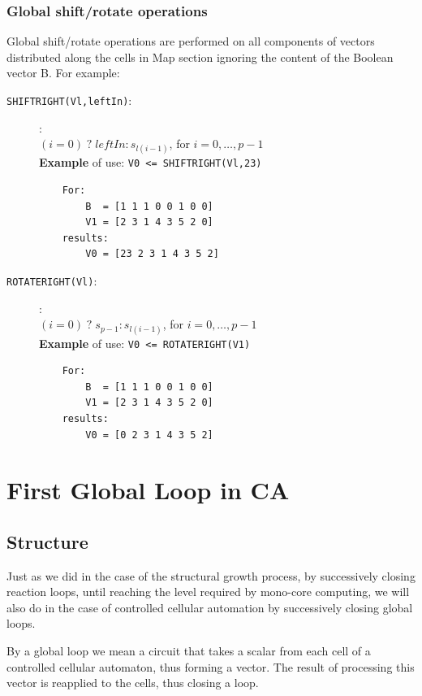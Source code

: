 \subsubsection{Global shift/rotate operations} 

Global shift/rotate operations are performed on all components of vectors distributed along the cells in Map section ignoring the content of the Boolean vector B. For example:
\begin{description}
    \item[{\tt SHIFTRIGHT(Vl,leftIn)}:]:   \\
    $ (i=0) \; ? \; leftIn : s_{l(i-1)}$, for $i = 0, \ldots, p-1$\\
    {\bf Example} of use: {\tt V0 <= SHIFTRIGHT(Vl,23)} \\
    \begin{verbatim}
    For:
        B  = [1 1 1 0 0 1 0 0]
        V1 = [2 3 1 4 3 5 2 0]
    results:
        V0 = [23 2 3 1 4 3 5 2]
    \end{verbatim}
    \item[{\tt ROTATERIGHT(Vl)}:]:  \\
    $ (i=0) \; ? \; s_{p-1} : s_{l(i-1)}$, for $i = 0, \ldots, p-1$\\
    {\bf Example} of use: {\tt V0 <= ROTATERIGHT(V1)} \\
    \begin{verbatim}
    For:
        B  = [1 1 1 0 0 1 0 0]
        V1 = [2 3 1 4 3 5 2 0]
    results:
        V0 = [0 2 3 1 4 3 5 2]
    \end{verbatim}
\end{description}

\section{First Global Loop in CA}

\subsection{Structure}

Just as we did in the case of the structural growth process, by successively closing reaction loops, until reaching the level required by mono-core computing, we will also do in the case of controlled cellular automation by successively closing global loops.

By a global loop we mean a circuit that takes a scalar from each cell of a controlled cellular automaton, thus forming a vector. The result of processing this vector is reapplied to the cells, thus closing a loop.

